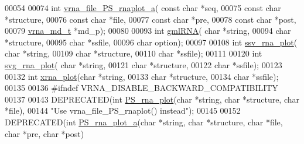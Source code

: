 \begin{DoxyCode}
00054 
00074 \textcolor{keywordtype}{int} \hyperlink{group__plotting__utils_ga139a31dd0ba9fc6612431f67de901c31}{vrna\_file\_PS\_rnaplot\_a}( \textcolor{keyword}{const} \textcolor{keywordtype}{char} *seq,
00075                             \textcolor{keyword}{const} \textcolor{keywordtype}{char} *structure,
00076                             \textcolor{keyword}{const} \textcolor{keywordtype}{char} *file,
00077                             \textcolor{keyword}{const} \textcolor{keywordtype}{char} *pre,
00078                             \textcolor{keyword}{const} \textcolor{keywordtype}{char} *post,
00079                             \hyperlink{group__model__details_structvrna__md__s}{vrna\_md\_t}  *md\_p);
00080 
00093 \textcolor{keywordtype}{int} \hyperlink{group__plotting__utils_ga70834bc8c0aad4fe6824ff76ccb8f329}{gmlRNA}( \textcolor{keywordtype}{char} *\textcolor{keywordtype}{string},
00094             \textcolor{keywordtype}{char} *structure,
00095             \textcolor{keywordtype}{char} *ssfile,
00096             \textcolor{keywordtype}{char} option);
00097 
00108 \textcolor{keywordtype}{int} \hyperlink{group__plotting__utils_gadd368528755f9a830727b680243541df}{ssv\_rna\_plot}( \textcolor{keywordtype}{char} *\textcolor{keywordtype}{string},
00109                   \textcolor{keywordtype}{char} *structure,
00110                   \textcolor{keywordtype}{char} *ssfile);
00111 
00120 \textcolor{keywordtype}{int} \hyperlink{group__plotting__utils_gae7853539b5df98f294b4af434e979304}{svg\_rna\_plot}( \textcolor{keywordtype}{char} *\textcolor{keywordtype}{string},
00121                   \textcolor{keywordtype}{char} *structure,
00122                   \textcolor{keywordtype}{char} *ssfile);
00123 
00132 \textcolor{keywordtype}{int} \hyperlink{group__plotting__utils_ga2f6d5953e6a323df898896b8d6614483}{xrna\_plot}(\textcolor{keywordtype}{char} *\textcolor{keywordtype}{string},
00133               \textcolor{keywordtype}{char} *structure,
00134               \textcolor{keywordtype}{char} *ssfile);
00135 
00136 \textcolor{preprocessor}{#ifndef VRNA\_DISABLE\_BACKWARD\_COMPATIBILITY}
00137 
00143 DEPRECATED(\textcolor{keywordtype}{int} \hyperlink{group__plotting__utils_ga0873c7cc4cd7a11c9a2cea19dde7e9c9}{PS\_rna\_plot}(\textcolor{keywordtype}{char} *\textcolor{keywordtype}{string}, \textcolor{keywordtype}{char} *structure, \textcolor{keywordtype}{char} *file),
00144 \textcolor{stringliteral}{"Use vrna\_file\_PS\_rnaplot() instead"});
00145 
00152 DEPRECATED(\textcolor{keywordtype}{int} \hyperlink{group__plotting__utils_ga47856b2504b566588785597b6ebb8271}{PS\_rna\_plot\_a}(\textcolor{keywordtype}{char} *\textcolor{keywordtype}{string}, \textcolor{keywordtype}{char} *structure, \textcolor{keywordtype}{char} *file, \textcolor{keywordtype}{char} *pre, \textcolor{keywordtype}{char} *post)

\end{DoxyCode}
